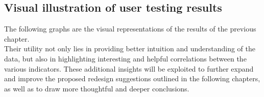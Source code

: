 \graphicspath{ {./root/2.UserTesting/res/} }

\subsection{Visual illustration of user testing results}

The following graphs are the visual representations of the results of the previous chapter.\\
Their utility not only lies in providing better intuition and understanding of the data, but also in highlighting interesting and helpful correlations between the various indicators. These additional insights will be exploited to further expand and improve the proposed redesign suggestions outlined in the following chapters, as well as to draw more thoughtful and deeper conclusions.

